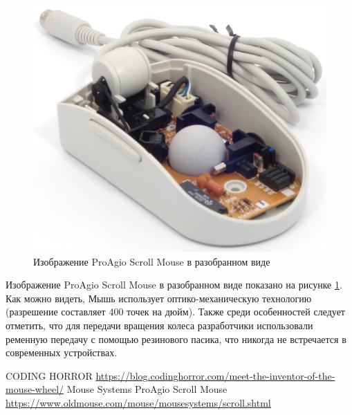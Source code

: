 \documentclass[11pt, a4paper]{article}
\begin{document}
\begin{figure}[h]
    \centering
    \includegraphics[scale=0.8]{1995_pro_agio_scroll_mouse/inside_30.jpg}
    \caption{Изображение ProAgio Scroll Mouse в разобранном виде}
    \label{fig:ScrollInside}
\end{figure}

Изображение ProAgio Scroll Mouse в разобранном виде показано на рисунке \ref{fig:ScrollInside}. Как можно видеть, Мышь использует оптико-механическую технологию (разрешение составляет 400 точек на дюйм). Также среди особенностей следует отметить, что для передачи вращения колеса разработчики использовали ременную передачу с помощью резинового пасика, что никогда не встречается в современных устройствах.

\begin{thebibliography}{9}
 CODING HORROR \url{https://blog.codinghorror.com/meet-the-inventor-of-the-mouse-wheel/}
 Mouse Systems ProAgio Scroll Mouse \url{https://www.oldmouse.com/mouse/mousesystems/scroll.shtml}
\end{thebibliography}
\end{document}
